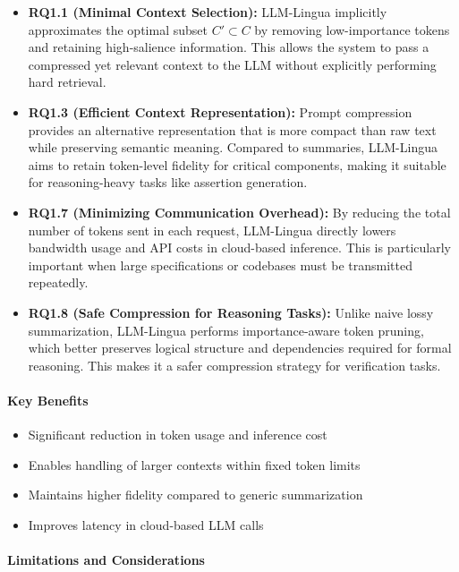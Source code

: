 \documentclass[12pt,a4paper]{article}
\begin{document}
\begin{itemize}
\item \textbf{RQ1.1 (Minimal Context Selection):}
LLM-Lingua implicitly approximates the optimal subset $C' \subset C$ by removing low-importance tokens and retaining high-salience information. This allows the system to pass a compressed yet relevant context to the LLM without explicitly performing hard retrieval.

\item \textbf{RQ1.3 (Efficient Context Representation):}  
Prompt compression provides an alternative representation that is more compact than raw text while preserving semantic meaning. Compared to summaries, LLM-Lingua aims to retain token-level fidelity for critical components, making it suitable for reasoning-heavy tasks like assertion generation.

\item \textbf{RQ1.7 (Minimizing Communication Overhead):}  
By reducing the total number of tokens sent in each request, LLM-Lingua directly lowers bandwidth usage and API costs in cloud-based inference. This is particularly important when large specifications or codebases must be transmitted repeatedly.

\item \textbf{RQ1.8 (Safe Compression for Reasoning Tasks):}  
Unlike naive lossy summarization, LLM-Lingua performs importance-aware token pruning, which better preserves logical structure and dependencies required for formal reasoning. This makes it a safer compression strategy for verification tasks.

\end{itemize}

\paragraph{Key Benefits}

\begin{itemize}
\item Significant reduction in token usage and inference cost
\item Enables handling of larger contexts within fixed token limits
\item Maintains higher fidelity compared to generic summarization
\item Improves latency in cloud-based LLM calls
\end{itemize}

\paragraph{Limitations and Considerations}
\end{document}
